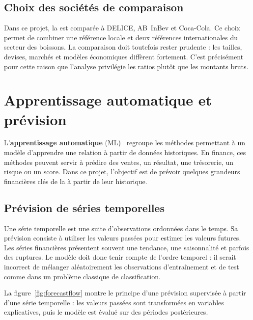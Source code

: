 \subsection{Choix des sociétés de comparaison}
\par Dans ce projet, la \sfbt est comparée à DELICE, AB~InBev et Coca-Cola. Ce
choix permet de combiner une référence locale et deux références internationales
du secteur des boissons. La comparaison doit toutefois rester prudente : les
tailles, devises, marchés et modèles économiques diffèrent fortement. C'est
précisément pour cette raison que l'analyse privilégie les ratios plutôt que les
montants bruts.

\section{Apprentissage automatique et prévision}
\label{sec:ml}
\par L'\textbf{apprentissage automatique} (\ac{ML})~\cite{james2021} regroupe
les méthodes permettant à un modèle d'apprendre une relation à partir de données
historiques. En finance, ces méthodes peuvent servir à prédire des ventes, un
résultat, une trésorerie, un risque ou un score. Dans ce projet, l'objectif est
de prévoir quelques grandeurs financières clés de la \sfbt à partir de leur
historique.

\subsection{Prévision de séries temporelles}
\par Une série temporelle est une suite d'observations ordonnées dans le temps.
Sa prévision consiste à utiliser les valeurs passées pour estimer les valeurs
futures. Les séries financières présentent souvent une tendance, une saisonnalité
et parfois des ruptures. Le modèle doit donc tenir compte de l'ordre temporel :
il serait incorrect de mélanger aléatoirement les observations d'entraînement et
de test comme dans un problème classique de classification.

\par La figure~\ref{fig:forecastflow} montre le principe d'une prévision
supervisée à partir d'une série temporelle : les valeurs passées sont transformées
en variables explicatives, puis le modèle est évalué sur des périodes
postérieures.

